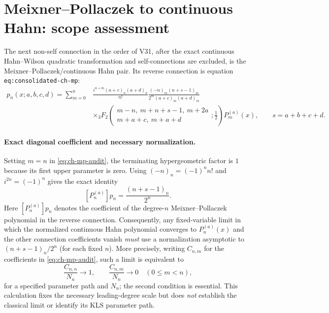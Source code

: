 \documentclass[11pt]{article}
\begin{document}
\section{Meixner--Pollaczek to continuous Hahn: scope assessment}
The next non-self connection in the order of V31, after the exact continuous Hahn--Wilson quadratic transformation and self-connections are excluded, is the Meixner--Pollaczek/continuous Hahn pair. Its reverse connection is equation \texttt{eq:consolidated-ch-mp}:
\begin{equation}\label{eq:ch-mp-audit}
\begin{split}
p_n(x;a,b,c,d)=\sum_{m=0}^n &\frac{i^{n+m}(a+c)_n(a+d)_n}{n!}
\frac{(-n)_m(n+s-1)_m}{2^m(a+c)_m(a+d)_m}\\
&\times {}_3F_2\!\left(\begin{matrix}m-n,\ m+n+s-1,\ m+2a\\m+a+c,\ m+a+d\end{matrix};\frac12\right)P_m^{(a)}(x),\qquad s=a+b+c+d.
\end{split}
\end{equation}
\paragraph{Exact diagonal coefficient and necessary normalization.}
Setting $m=n$ in \eqref{eq:ch-mp-audit}, the terminating hypergeometric factor is $1$ because its first upper parameter is zero. Using $(-n)_n=(-1)^n n!$ and $i^{2n}=(-1)^n$ gives the exact identity
\begin{equation}\label{eq:mp-diagonal}
 [P_n^{(a)}]p_n=\frac{(n+s-1)_n}{2^n}.
\end{equation}
Here $[P_n^{(a)}]p_n$ denotes the coefficient of the degree-$n$ Meixner--Pollaczek polynomial in the reverse connection. Consequently, any fixed-variable limit in which the normalized continuous Hahn polynomial converges to $P_n^{(a)}(x)$ and the other connection coefficients vanish \emph{must} use a normalization asymptotic to $(n+s-1)_n/2^n$ (for each fixed $n$). More precisely, writing $C_{n,m}$ for the coefficients in \eqref{eq:ch-mp-audit}, such a limit is equivalent to
\[
 \frac{C_{n,n}}{N_n}\longrightarrow 1,
 \qquad \frac{C_{n,m}}{N_n}\longrightarrow0\quad(0\le m<n),
\]
for a specified parameter path and $N_n$; the second condition is essential. This calculation fixes the necessary leading-degree scale but does \emph{not} establish the classical limit or identify its KLS parameter path.
\end{document}
